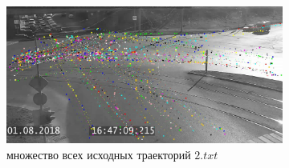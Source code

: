 \begin{figure}[!htb]
	\centering
	\begin{subfigure}[!htb]{0.68\textwidth}
		\centering{}
		\includegraphics[width=\textwidth]{images/regr_kp_full.png}
		\caption{множество всех исходных траекторий $2.txt$}
	\end{subfigure}
	\hfill
	\begin{subfigure}[!htb]{0.3\textwidth}
		\centering{}

\end{subfigure}
\end{figure}
